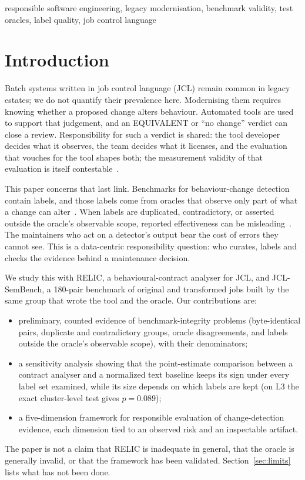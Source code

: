 \documentclass[conference]{IEEEtran}
\begin{document}
\begin{IEEEkeywords}
responsible software engineering, legacy modernisation, benchmark validity, test oracles, label quality, job control language
\end{IEEEkeywords}

\section{Introduction}
Batch systems written in job control language (JCL) remain common in legacy estates; we do not quantify their prevalence here. Modernising them requires knowing whether a proposed change alters behaviour. Automated tools are used to support that judgement, and an EQUIVALENT or ``no change'' verdict can close a review. Responsibility for such a verdict is shared: the tool developer decides what it observes, the team decides what it licenses, and the evaluation that vouches for the tool shapes both; the measurement validity of that evaluation is itself contestable~\cite{jacobs2021}.

This paper concerns that last link. Benchmarks for behaviour-change detection contain labels, and those labels come from oracles that observe only part of what a change can alter~\cite{barr2015,staats2011}. When labels are duplicated, contradictory, or asserted outside the oracle's observable scope, reported effectiveness can be misleading~\cite{northcutt2021}. The maintainers who act on a detector's output bear the cost of errors they cannot see. This is a data-centric responsibility question: who curates, labels and checks the evidence behind a maintenance decision.

We study this with RELIC, a behavioural-contract analyser for JCL, and JCL-SemBench, a 180-pair benchmark of original and transformed jobs built by the same group that wrote the tool and the oracle. Our contributions are:
\begin{itemize}
\item preliminary, counted evidence of benchmark-integrity problems (byte-identical pairs, duplicate and contradictory groups, oracle disagreements, and labels outside the oracle's observable scope), with their denominators;
\item a sensitivity analysis showing that the point-estimate comparison between a contract analyser and a normalized text baseline keeps its sign under every label set examined, while its size depends on which labels are kept (on L3 the exact cluster-level test gives $p=0.089$);
\item a five-dimension framework for responsible evaluation of change-detection evidence, each dimension tied to an observed risk and an inspectable artifact.
\end{itemize}
The paper is not a claim that RELIC is inadequate in general, that the oracle is generally invalid, or that the framework has been validated. Section~\ref{sec:limits} lists what has not been done.
\end{document}
